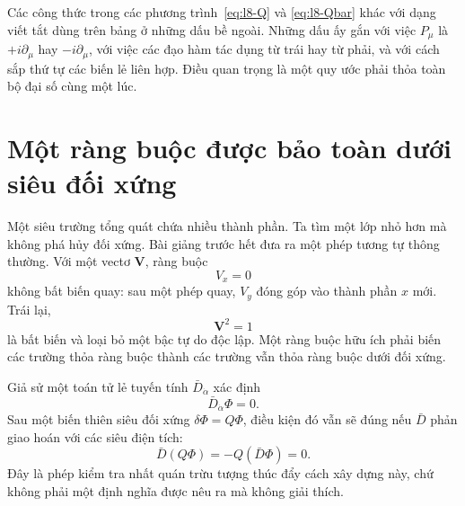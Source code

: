 \begin{classroomqa}
\end{classroomqa}

\begin{classroomqa}
\end{classroomqa}

Các công thức trong các phương trình~\eqref{eq:l8-Q} và \eqref{eq:l8-Qbar} khác với dạng viết tắt dùng trên bảng ở những dấu bề ngoài. Những dấu ấy gắn với việc \(P_\mu\) là \(+i\partial_\mu\) hay \(-i\partial_\mu\), với việc các đạo hàm tác dụng từ trái hay từ phải, và với cách sắp thứ tự các biến lẻ liên hợp. Điều quan trọng là một quy ước phải thỏa toàn bộ đại số cùng một lúc.

\section{Một ràng buộc được bảo toàn dưới siêu đối xứng}

Một siêu trường tổng quát chứa nhiều thành phần. Ta tìm một lớp nhỏ hơn mà không phá hủy đối xứng. Bài giảng trước hết đưa ra một phép tương tự thông thường. Với một vectơ \(\mathbf V\), ràng buộc
\begin{equation}
V_x=0
\end{equation}
không bất biến quay: sau một phép quay, \(V_y\) đóng góp vào thành phần \(x\) mới. Trái lại,
\begin{equation}
\mathbf V^2=1
\end{equation}
là bất biến và loại bỏ một bậc tự do độc lập. Một ràng buộc hữu ích phải biến các trường thỏa ràng buộc thành các trường vẫn thỏa ràng buộc dưới đối xứng.

Giả sử một toán tử lẻ tuyến tính \(\bar D_{\dot\alpha}\) xác định
\begin{equation}
\bar D_{\dot\alpha}\Phi=0.
\label{eq:l8-chiral-constraint}
\end{equation}
Sau một biến thiên siêu đối xứng \(\delta\Phi=Q\Phi\), điều kiện đó vẫn sẽ đúng nếu \(\bar D\) phản giao hoán với các siêu điện tích:
\begin{equation}
\bar D(Q\Phi)=-Q(\bar D\Phi)=0.
\end{equation}
Đây là phép kiểm tra nhất quán trừu tượng thúc đẩy cách xây dựng này, chứ không phải một định nghĩa được nêu ra mà không giải thích.

